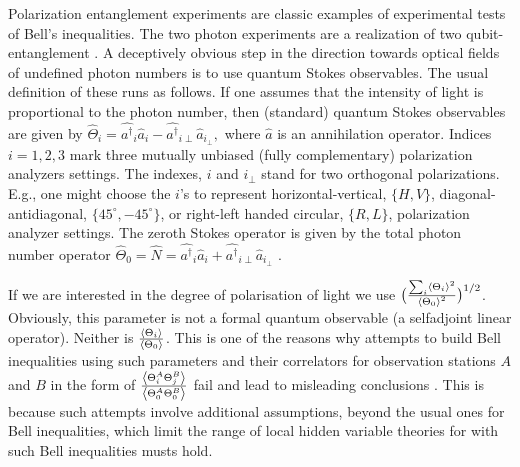 \documentclass[aps,pra, twocolumn, showpacs]{revtex4-2}
\begin{document}
Polarization entanglement experiments are classic examples of experimental tests of Bell's inequalities.
The two photon experiments are a realization of two qubit-entanglement \cite{POLEXP1,POLEXP2}. 
A deceptively obvious  step in the direction towards optical fields of undefined photon numbers is to use quantum Stokes observables. 
The usual definition of these
runs as follows. If one assumes that the intensity of light is proportional to the photon number, then (standard) quantum Stokes observables are given by 
$\hat{\Theta}_i =
\hat{a^{\dagger}}_i\hat{a}_{i} -  \hat{a^{\dagger}}_{i\perp}\hat{a}_{i_{\perp}}, 
$
where  $\hat a$ is an annihilation operator.  Indices $i = 1,2,3$ mark three mutually unbiased (fully complementary) polarization analyzers settings.  The indexes, $i$ and   $i_{\perp}$ stand for two  orthogonal polarizations. 
E.g., one might choose the $i$'s to represent horizontal-vertical, $\{H,V\}$, diagonal-antidiagonal, $\{45^{\circ}, -45^{\circ}\} $, or right-left handed circular, $\{R,L\}$, polarization analyzer settings. 
The zeroth Stokes operator is given by the total photon number  operator $\hat \Theta_0 = \hat{N}= \hat{a^{\dagger}}_i\hat{a}_{i} +  \hat{a^{\dagger}}_{i\perp}\hat{a}_{i_{\perp}}$ \cite{PHOTONS}. 

If we are interested in the degree of polarisation of  light  we use
$\big(\frac{\sum_i\expval{\Theta_i}^2}{\expval{\Theta_0}^2}\big)^{1/2}$. 
Obviously,  this parameter is not a formal quantum observable (a selfadjoint linear operator). Neither is $\frac{\expval{\Theta_i}}{\expval{\Theta_0}}$. 
This  is  one of the reasons why attempts to build Bell inequalities using such parameters and their correlators for observation stations $A$ and $B$ in the form of $\frac{\expval{\Theta^A_i\Theta^B_j}}{\expval{\Theta^A_0\Theta^B_0}}$ fail and lead to misleading conclusions \cite{SINGLE1}. This is because such attempts involve additional assumptions, beyond the usual ones for Bell inequalities, which limit the range of local hidden variable theories for with such Bell inequalities musts hold.  
\end{document}
